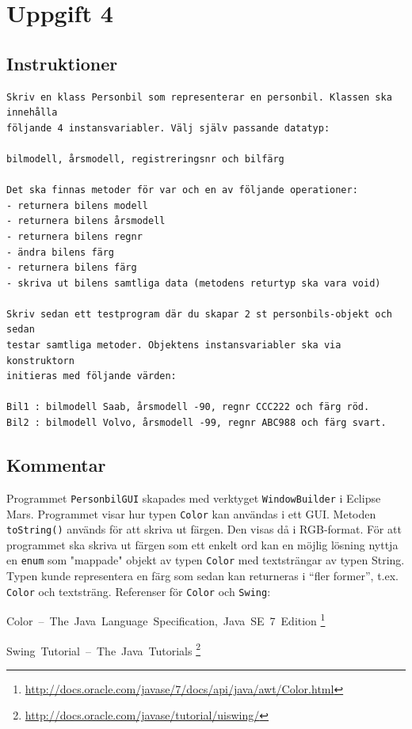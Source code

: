 \section{Uppgift 4}\label{sec:uppg04}

\subsection{Instruktioner}
\begin{Verbatim}[fontsize=\small]
Skriv en klass Personbil som representerar en personbil. Klassen ska innehålla
följande 4 instansvariabler. Välj själv passande datatyp:

bilmodell, årsmodell, registreringsnr och bilfärg

Det ska finnas metoder för var och en av följande operationer:
- returnera bilens modell
- returnera bilens årsmodell
- returnera bilens regnr
- ändra bilens färg
- returnera bilens färg
- skriva ut bilens samtliga data (metodens returtyp ska vara void)

Skriv sedan ett testprogram där du skapar 2 st personbils-objekt och sedan
testar samtliga metoder. Objektens instansvariabler ska via konstruktorn
initieras med följande värden:

Bil1 : bilmodell Saab, årsmodell -90, regnr CCC222 och färg röd.
Bil2 : bilmodell Volvo, årsmodell -99, regnr ABC988 och färg svart.
\end{Verbatim}


\subsection{Kommentar}
Programmet \texttt{PersonbilGUI} skapades med verktyget \texttt{WindowBuilder}
i Eclipse Mars. Programmet visar hur typen \texttt{Color} kan användas i ett
GUI.  Metoden \texttt{toString()} används för att skriva ut färgen. Den visas
då i RGB-format. För att programmet ska skriva ut färgen som ett enkelt ord kan
en möjlig lösning nyttja en \texttt{enum} som "mappade" objekt av typen
\texttt{Color} med textsträngar av typen String. Typen kunde representera en
färg som sedan kan returneras i ``fler former'', t.ex. \texttt{Color} och
textsträng.
Referenser för \texttt{Color} och \texttt{Swing}:

\mbox{Color -- The Java Language Specification, Java SE 7 Edition}
\footnote{\url{http://docs.oracle.com/javase/7/docs/api/java/awt/Color.html}}

\mbox{Swing Tutorial -- The Java Tutorials}
\footnote{\url{http://docs.oracle.com/javase/tutorial/uiswing/}}



